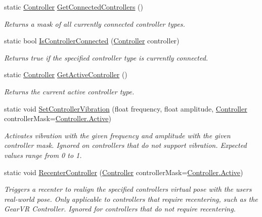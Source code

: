 \begin{DoxyCompactItemize}
static \mbox{\hyperlink{class_o_v_r_input_a5c86f9052a9cbb0b73779ff5704d60a8}{Controller}} \mbox{\hyperlink{class_o_v_r_input_a057e31053088d33555d5465313929148}{Get\+Connected\+Controllers}} ()
\begin{DoxyCompactList}\small\item\em Returns a mask of all currently connected controller types. \end{DoxyCompactList}\item 
static bool \mbox{\hyperlink{class_o_v_r_input_a3f4e283bf5665cbd9e2272d6ed5b54c0}{Is\+Controller\+Connected}} (\mbox{\hyperlink{class_o_v_r_input_a5c86f9052a9cbb0b73779ff5704d60a8}{Controller}} controller)
\begin{DoxyCompactList}\small\item\em Returns true if the specified controller type is currently connected. \end{DoxyCompactList}\item 
static \mbox{\hyperlink{class_o_v_r_input_a5c86f9052a9cbb0b73779ff5704d60a8}{Controller}} \mbox{\hyperlink{class_o_v_r_input_aac9caffc4a6ddf1d467ed3cb63bc0db2}{Get\+Active\+Controller}} ()
\begin{DoxyCompactList}\small\item\em Returns the current active controller type. \end{DoxyCompactList}\item 
static void \mbox{\hyperlink{class_o_v_r_input_a53bfdaf8b68f660d37acaabdd79c26e9}{Set\+Controller\+Vibration}} (float frequency, float amplitude, \mbox{\hyperlink{class_o_v_r_input_a5c86f9052a9cbb0b73779ff5704d60a8}{Controller}} controller\+Mask=\mbox{\hyperlink{class_o_v_r_input_a5c86f9052a9cbb0b73779ff5704d60a8a4d3d769b812b6faa6b76e1a8abaece2d}{Controller.\+Active}})
\begin{DoxyCompactList}\small\item\em Activates vibration with the given frequency and amplitude with the given controller mask. Ignored on controllers that do not support vibration. Expected values range from 0 to 1. \end{DoxyCompactList}\item 
static void \mbox{\hyperlink{class_o_v_r_input_ac31fe82f3aab6c0964331831a94833ce}{Recenter\+Controller}} (\mbox{\hyperlink{class_o_v_r_input_a5c86f9052a9cbb0b73779ff5704d60a8}{Controller}} controller\+Mask=\mbox{\hyperlink{class_o_v_r_input_a5c86f9052a9cbb0b73779ff5704d60a8a4d3d769b812b6faa6b76e1a8abaece2d}{Controller.\+Active}})
\begin{DoxyCompactList}\small\item\em Triggers a recenter to realign the specified controller\textquotesingle{}s virtual pose with the user\textquotesingle{}s real-\/world pose. Only applicable to controllers that require recentering, such as the Gear\+VR Controller. Ignored for controllers that do not require recentering. \end{DoxyCompactList}\item 

\end{DoxyCompactItemize}
